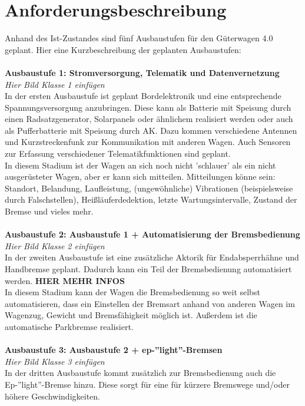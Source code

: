 \section{Anforderungsbeschreibung}
Anhand des Ist-Zustandes sind fünf Ausbaustufen für den Güterwagen 4.0 geplant. Hier eine Kurzbeschreibung der geplanten Ausbaustufen:\\\\
\textbf{Ausbaustufe 1: Stromversorgung, Telematik und Datenvernetzung}\\
\textit{ Hier Bild Klasse 1 einfügen}\\
In der ersten Ausbaustufe ist geplant Bordelektronik und eine entsprechende Spannungsversorgung anzubringen. Diese kann als Batterie mit Speisung durch einen Radsatzgenerator, Solarpanels oder ähnlichem realisiert werden oder auch als Pufferbatterie mit Speisung durch AK. Dazu kommen verschiedene Antennen und Kurzstreckenfunk zur Kommunikation mit anderen Wagen. Auch Sensoren zur Erfassung verschiedener Telematikfunktionen sind geplant. \\
In diesem Stadium ist der Wagen an sich noch nicht 'schlauer' als ein nicht ausgerüsteter Wagen, aber er kann sich mitteilen. Mitteilungen könne sein: Standort, Belandung, Laufleistung, (ungewöhnliche) Vibrationen (beispielsweise durch Falschstellen), Heißläuferdedektion, letzte Wartungsintervalle, Zustand der Bremse und vieles mehr.\\\\
\textbf{Ausbaustufe 2: Ausbaustufe 1 + Automatisierung der Bremsbedienung}\\
\textit{ Hier Bild Klasse 2 einfügen}\\
In der zweiten Ausbaustufe ist eine zusätzliche Aktorik für Endabsperrhähne und Handbremse geplant. Dadurch kann ein Teil der Bremsbedienung automatisiert werden. \textbf{HIER MEHR INFOS}\\
In diesem Stadium kann der Wagen die Bremsbedienung so weit selbst automatisieren, dass ein Einstellen der Bremsart anhand von anderen Wagen im Wagenzug, Gewicht und Bremsfähigkeit möglich ist. Außerdem ist die automatische Parkbremse realisiert.\\\\
\textbf{Ausbaustufe 3: Ausbaustufe 2 + ep-''light''-Bremsen}\\
\textit{Hier Bild Klasse 3 einfügen}\\
In der dritten Ausbaustufe kommt zusätzlich zur Bremsbedienung auch die Ep-''light''-Bremse hinzu. Diese sorgt für eine für kürzere Bremswege und/oder höhere Geschwindigkeiten.\\
